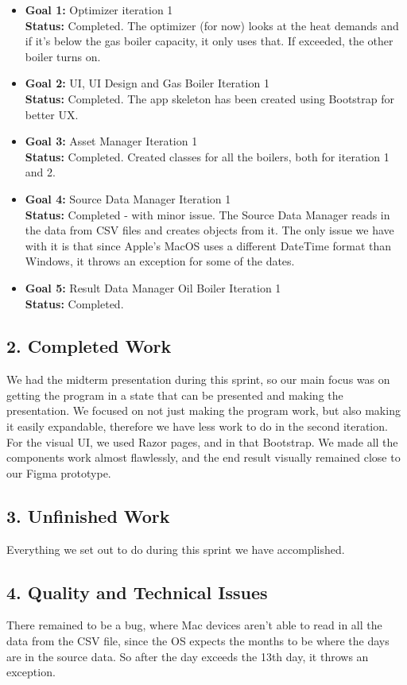 \documentclass[12pt]{report}
\begin{document}
\begin{itemize}
    \item \textbf{Goal 1:} Optimizer iteration 1\\
    \textbf{Status:} Completed. The optimizer (for now) looks at the heat demands and if it's below the gas boiler capacity, it only uses that. If exceeded, the other boiler turns on.
    \item \textbf{Goal 2:} UI, UI Design and Gas Boiler Iteration 1\\
    \textbf{Status:} Completed. The app skeleton has been created using Bootstrap for better UX.
    \item \textbf{Goal 3:} Asset Manager Iteration 1\\
    \textbf{Status:} Completed. Created classes for all the boilers, both for iteration 1 and 2.
    \item \textbf{Goal 4:} Source Data Manager Iteration 1\\
    \textbf{Status:} Completed - with minor issue. The Source Data Manager reads in the data from CSV files and creates objects from it. The only issue we have with it is that since Apple's MacOS uses a different DateTime format than Windows, it throws an exception for some of the dates.
    \item \textbf{Goal 5:} Result Data Manager Oil Boiler Iteration 1\\
    \textbf{Status:} Completed.
\end{itemize}

\subsection*{2. Completed Work}
We had the midterm presentation during this sprint, so our main focus was on getting the program in a state that can be presented and making the presentation. We focused on not just making the program work, but also making it easily expandable, therefore we have less work to do in the second iteration. For the visual UI, we used Razor pages, and in that Bootstrap. We made all the components work almost flawlessly, and the end result visually remained close to our Figma prototype.
\subsection*{3. Unfinished Work}
Everything we set out to do during this sprint we have accomplished.
\subsection*{4. Quality and Technical Issues}
There remained to be a bug, where Mac devices aren't able to read in all the data from the CSV file, since the OS expects the months to be where the days are in the source data. So after the day exceeds the 13th day, it throws an exception.
\end{document}
